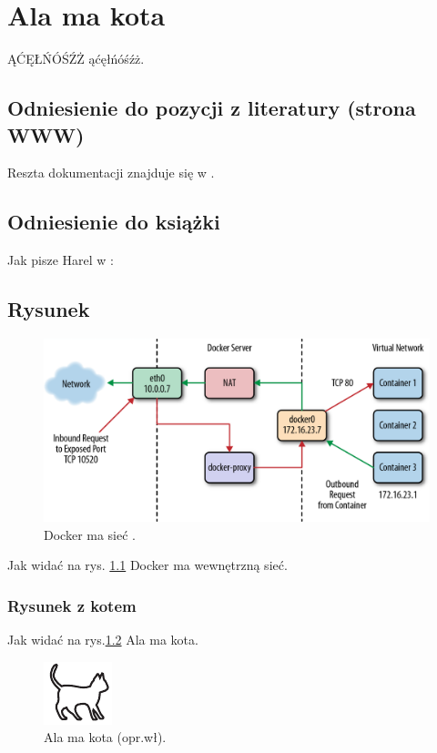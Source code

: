 \chapter{Ala ma kota}

ĄĆĘŁŃÓŚŹŻ ąćęłńóśźż. \lipsum[1]

\section{Odniesienie do pozycji z literatury (strona WWW)}

Reszta dokumentacji znajduje się w \cite{docker_compose_reference}. \lipsum[3]

\section{Odniesienie do książki}

Jak pisze Harel w \cite{harel_rzecz_2008}: \lipsum[7]

\section{Rysunek}

\begin{figure}
\centering\includegraphics[width=.6\textwidth]{img/swarm-network}
\caption{Docker ma sieć \cite{docker_compose_reference}.}  \label{rys:network}%
\end{figure}

Jak widać na rys. \ref{rys:network} Docker ma wewnętrzną sieć. \lipsum[1]


\subsection{Rysunek z kotem}

Jak widać na rys.\ref{rysunek:kot} Ala ma kota. \lipsum[9-10] 

\begin{figure}
\centering\includegraphics[width=.4\textwidth]{img/kotek}
\caption{Ala ma kota (opr.wł).}\label{rysunek:kot}
\end{figure}

